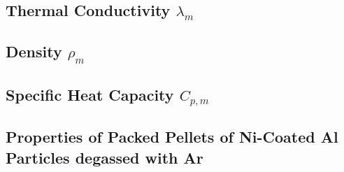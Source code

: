 \documentclass[../main.tex]{subfiles}
\begin{document}
\subsection{Thermal Conductivity $\lambda_m$}



\subsection{Density $\rho_m$}



\subsection{Specific Heat Capacity $C_{p,m}$}



\subsection{Properties of Packed Pellets of Ni-Coated Al Particles degassed with Ar}


\end{document}
